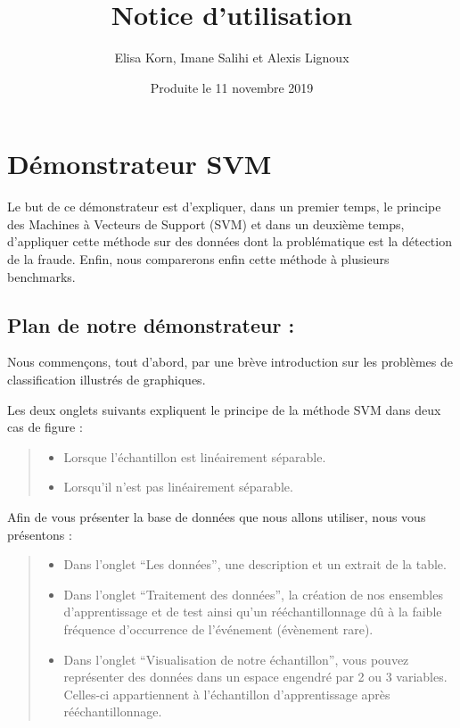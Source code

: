 \documentclass[]{article}
\title{Notice d'utilisation}
\author{Elisa Korn, Imane Salihi et Alexis Lignoux}
\date{Produite le 11 novembre 2019}
\providecommand{\tightlist}{%
  \setlength{\itemsep}{0pt}\setlength{\parskip}{0pt}}
\begin{document}
\maketitle

\hypertarget{demonstrateur-svm}{%
\section{Démonstrateur SVM}\label{demonstrateur-svm}}

Le but de ce démonstrateur est d'expliquer, dans un premier temps, le
principe des Machines à Vecteurs de Support (SVM) et dans un deuxième
temps, d'appliquer cette méthode sur des données dont la problématique
est la détection de la fraude. Enfin, nous comparerons enfin cette
méthode à plusieurs benchmarks.

\hypertarget{plan-de-notre-demonstrateur}{%
\subsection{Plan de notre démonstrateur
:}\label{plan-de-notre-demonstrateur}}

Nous commençons, tout d'abord, par une brève introduction sur les
problèmes de classification illustrés de graphiques.

Les deux onglets suivants expliquent le principe de la méthode SVM dans
deux cas de figure :

\begin{quote}
\begin{itemize}
\tightlist
\item
  Lorsque l'échantillon est linéairement séparable.
\item
  Lorsqu'il n'est pas linéairement séparable.
\end{itemize}
\end{quote}

Afin de vous présenter la base de données que nous allons utiliser, nous
vous présentons :

\begin{quote}
\begin{itemize}
\tightlist
\item
  Dans l'onglet ``Les données'', une description et un extrait de la
  table.
\item
  Dans l'onglet ``Traitement des données'', la création de nos ensembles
  d'apprentissage et de test ainsi qu'un rééchantillonnage dû à la
  faible fréquence d'occurrence de l'événement (évènement rare).
\item
  Dans l'onglet ``Visualisation de notre échantillon'', vous pouvez
  représenter des données dans un espace engendré par 2 ou 3 variables.
  Celles-ci appartiennent à l'échantillon d'apprentissage après
  rééchantillonnage.
\end{itemize}
\end{quote}
\end{document}
